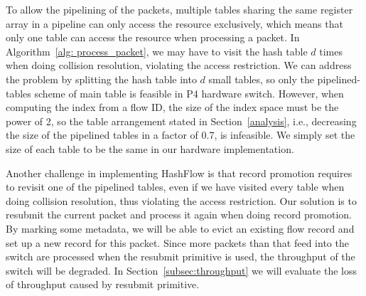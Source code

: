 To allow the pipelining of the packets, multiple tables sharing the same register array in a pipeline can only access the resource exclusively, which means that only one table can access the resource when processing a packet. In Algorithm~\ref{alg: process_packet}, we may have to visit the hash table $d$ times when doing collision resolution, violating the access restriction. We can address the problem by splitting the hash table into $d$ small tables, so only the pipelined-tables scheme of main table is feasible in P4 hardware switch. However, when computing the index from a flow ID, the size of the index space must be the power of 2, so the table arrangement stated in Section~\ref{analysis}, i.e., decreasing the size of the pipelined tables in a factor of 0.7, is infeasible. We simply set the size of each table to be the same in our hardware implementation.

Another challenge in implementing HashFlow is that record promotion requires to revisit one of the pipelined tables, even if we have visited every table when doing collision resolution, thus violating the access restriction. Our solution is to resubmit the current packet and process it again when doing record promotion. By marking some metadata, we will be able to evict an existing flow record and set up a new record for this packet. Since more packets than that feed into the switch are processed when the resubmit primitive is used, the throughput of the switch will be degraded. In Section~\ref{subsec:throughput} we will evaluate the loss of throughput caused by resubmit primitive.

